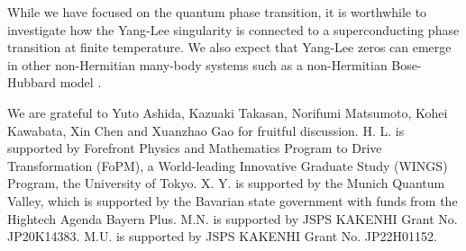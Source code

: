 \documentclass[aps,prl,twocolumn,superscriptaddress]{revtex4-1}
\begin{document}
While we have focused on the quantum phase transition, it is worthwhile
to investigate how the Yang-Lee singularity is connected to a superconducting
phase transition at finite temperature. We also expect that Yang-Lee
zeros can emerge in other non-Hermitian many-body systems such as
a non-Hermitian Bose-Hubbard model \cite{PhysRevA.94.053615}.

We are grateful to Yuto Ashida, Kazuaki Takasan, Norifumi Matsumoto,
Kohei Kawabata, Xin Chen and Xuanzhao Gao for fruitful discussion.
H. L. is supported by Forefront Physics and Mathematics Program to
Drive Transformation (FoPM), a World-leading Innovative Graduate Study
(WINGS) Program, the University of Tokyo. X. Y. is supported by the
Munich Quantum Valley, which is supported by the Bavarian state government
with funds from the Hightech Agenda Bayern Plus. M.N. is supported
by JSPS KAKENHI Grant No. JP20K14383. M.U. is supported by JSPS KAKENHI
Grant No. JP22H01152.


\end{document}
